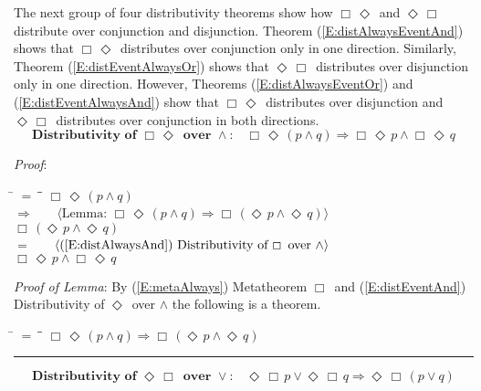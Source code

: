 \documentclass[12pt, fleqn, leqno]{article}
\newcommand{\lgap}{2pt}                             %
\newcommand{\mymathindent}{24pt}                    %
\newcommand{\impl}{\ensuremath{\Rightarrow}}        %
\newcommand{\Event}{\Diamond\,}
\newcommand{\Always}{\Box\,}
\newcommand{\myqed}{\rule[-.23ex]{1.2ex}{2.0ex}}
\newcommand{\myqedtab}{\hspace{384pt}}              %
\newcommand{\Gll} {\langle}                         %
\newcommand{\Ggg} {\rangle}                         %
\newcommand{\Hint}[1]     {\ \ \ $\Gll              \mbox{#1} \Ggg$ }   %
\begin{document}
The next group of four distributivity theorems show how $\Always\Event$ and $\Event\Always$
distribute over conjunction and disjunction.
Theorem (\ref{E:distAlwaysEventAnd}) shows that $\Always\Event$ distributes over conjunction only in one direction.
Similarly, Theorem (\ref{E:distEventAlwaysOr}) shows that $\Event\Always$ distributes over disjunction only in one direction.
However, Theorems (\ref{E:distAlwaysEventOr}) and (\ref{E:distEventAlwaysAnd}) show that $\Always\Event$ distributes over
disjunction and $\Event\Always$ distributes over conjunction in both directions.
\begin{equation}\label{E:distAlwaysEventAnd}
\textbf{Distributivity of $\Always\Event$ over $\land$:}\quad \Always\Event(p \land q) \impl \Always\Event p \land \Always\Event q
\end{equation}

\emph{Proof}:
\begin{tabbing}
\hspace{\mymathindent} \= $= \;$ \= \myqedtab \= \kill
  \> \>   $\Always\Event(p \land q)$\\[\lgap]
  \> $\impl$  \>  \Hint{Lemma: $\Always\Event(p \land q) \impl \Always(\Event p \land \Event q)$}\\[\lgap]
  \> \>   $\Always(\Event p \land \Event q)$\\[\lgap]
  \> $=$  \>  \Hint{(\ref{E:distAlwaysAnd}) Distributivity of $\Always$ over $\land$}\\[\lgap]
  \> \>   $\Always\Event p \land \Always\Event q$
\end{tabbing}

\emph{Proof of Lemma}:
By (\ref{E:metaAlways}) Metatheorem $\Always$ and (\ref{E:distEventAnd}) Distributivity of $\Event$ over $\land$ the following is a theorem.
\begin{tabbing}
\hspace{\mymathindent} \= $= \;$ \= \myqedtab \= \kill
  \> \>   $\Always\Event(p \land q) \impl \Always(\Event p \land \Event q)$ \quad \myqed
\end{tabbing}
\begin{equation}\label{E:distEventAlwaysOr}
\textbf{Distributivity of $\Event\Always$ over $\lor$:}\quad \Event\Always p \lor \Event\Always q \impl \Event\Always (p \lor q)
\end{equation}
\end{document}
